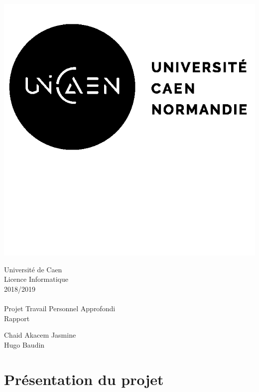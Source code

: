 \documentclass[hidelinks]{report}
\begin{document}
\renewcommand{\contentsname}{Sommaire}
\renewcommand{\thechapter}{\Roman{chapter}}
\renewcommand{\thesection}{\Alph{section}}
\renewcommand{\thesubsection}{\alph{subsection}}
\renewcommand{\chaptername}{Partie}

\begin{titlepage}
\begin{flushleft}
\includegraphics[scale=1]{logo.png}
\end{flushleft}
\begin{center}
\LARGE Universit\'e de Caen
\\
\Large Licence Informatique
\\
\Large 2018/2019
\\
\vspace*{2cm}
\hrulefill
\\
\huge Projet Travail Personnel Approfondi
\\
\huge Rapport
\\
\hrulefill
\end{center}
\vfill
\Large Chaid Akacem Jasmine
\\
\Large Hugo Baudin
\end{titlepage} 

\tableofcontents

\chapter{Présentation du projet}
\end{document}
